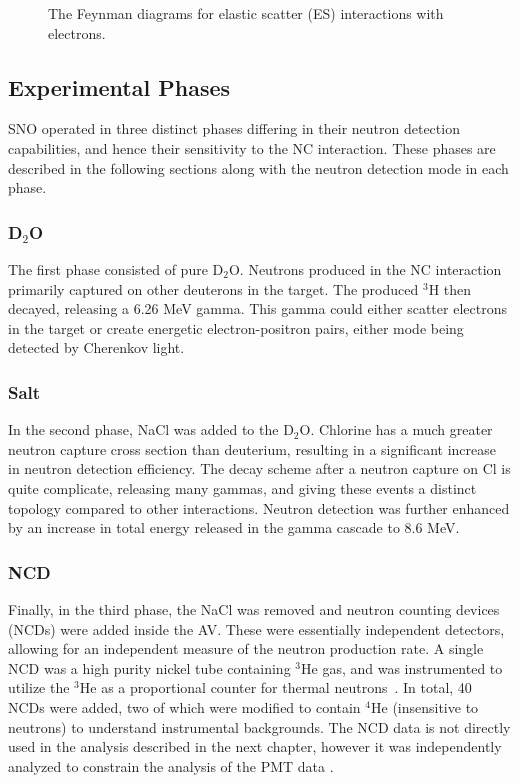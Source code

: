 \begin{figure}
\centering
\caption{\label{fig:ES}The Feynman diagrams for elastic scatter (ES) interactions with electrons.}
\end{figure}


\subsection{Experimental Phases}

SNO operated in three distinct phases differing in their neutron detection capabilities, and hence their sensitivity to the NC interaction.
These phases are described in the following sections along with the neutron detection mode in each phase.

\subsubsection{D$_2$O}

The first phase consisted of pure D$_2$O. 
Neutrons produced in the NC interaction primarily captured on other deuterons in the target.
The produced $^3$H then decayed, releasing a 6.26 MeV gamma.
This gamma could either scatter electrons in the target or create energetic electron-positron pairs, either mode being detected by Cherenkov light.

\subsubsection{Salt}

In the second phase, NaCl was added to the D$_2$O.
Chlorine has a much greater neutron capture cross section than deuterium, resulting in a significant increase in neutron detection efficiency.
The decay scheme after a neutron capture on Cl is quite complicate, releasing many gammas, and giving these events a distinct topology compared to other interactions.
Neutron detection was further enhanced by an increase in total energy released in the gamma cascade to 8.6 MeV.

\subsubsection{NCD}

Finally, in the third phase, the NaCl was removed and neutron counting devices (NCDs) were added inside the AV.
These were essentially independent detectors, allowing for an independent measure of the neutron production rate.
A single NCD was a high purity nickel tube containing $^3$He gas, and was instrumented to utilize the $^3$He as a proportional counter for thermal neutrons~\cite{ncd}.
In total, 40 NCDs were added, two of which were modified to contain $^4$He (insensitive to neutrons) to understand instrumental backgrounds.
The NCD data is not directly used in the analysis described in the next chapter, however it was independently analyzed to constrain the analysis of the PMT data \cite{psa}.

